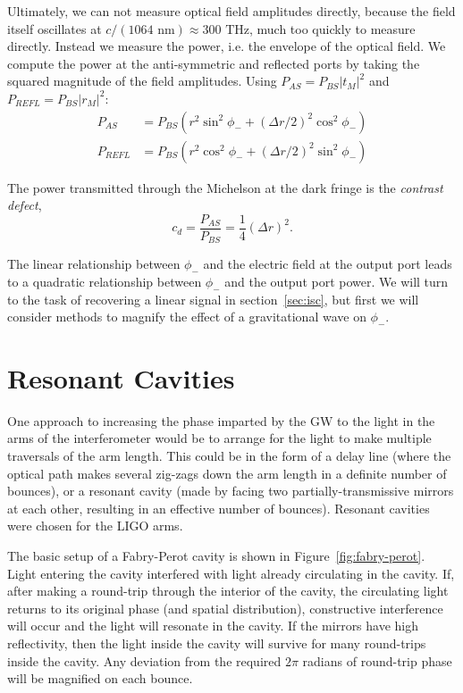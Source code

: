 Ultimately, we can not measure optical field amplitudes directly,
because the field itself oscillates at $c/(1064\text{ nm})\approx
300\text{ THz}$, much too quickly to measure directly.  Instead we
measure the power, i.e. the envelope of the optical field. We compute the
power at the anti-symmetric and reflected ports by taking the squared
magnitude of the field amplitudes.  Using $P_{AS} = P_{BS}
\left|t_M\right|^2$ and $P_{REFL} = P_{BS} \left|r_M\right|^2$:
%
\begin{align}
P_{AS}   &=  P_{BS}\left( {r}^2 \sin^2 \phi_- + (\Delta r/2)^2 \cos^2 \phi_-\right) \\
P_{REFL} &=  P_{BS}\left( {r}^2 \cos^2 \phi_- + (\Delta r/2)^2 \sin^2 \phi_-\right) 
\end{align}

The power transmitted through the Michelson at the dark fringe is the
\emph{contrast defect},
%
\begin{equation}
c_d = \frac{P_{AS}}{P_{BS}} = \frac{1}{4}\left(\Delta r\right)^2.
\end{equation}

The linear relationship between $\phi_-$ and the electric field at the
output port leads to a quadratic relationship between $\phi_-$
and the output port power.  We will turn to the task of recovering a
linear signal in section~\ref{sec:isc}, but first we will consider
methods to magnify the effect of a gravitational wave on $\phi_-$.

\section{Resonant Cavities}

One approach to increasing the phase imparted by the GW to the light
in the arms of the interferometer would be to arrange for the light to
make multiple traversals of the arm length.  This could be in the form
of a delay line (where the optical path makes several zig-zags down
the arm length in a definite number of bounces), or a resonant cavity
(made by facing two partially-transmissive mirrors at each other,
resulting in an effective number of bounces).  Resonant cavities were
chosen for the LIGO arms. 

The basic setup of a Fabry-Perot cavity is shown in Figure~\ref{fig:fabry-perot}.
Light entering the cavity interfered with light already
circulating in the cavity.  If, after making a round-trip through the
interior of the cavity, the circulating light returns to its original
phase (and spatial distribution), constructive interference will occur
and the light will resonate in the cavity.  If the mirrors have high
reflectivity, then the light inside the cavity will survive for many
round-trips inside the cavity. Any deviation from the required $2\pi$
radians of round-trip phase will be magnified on each bounce.

